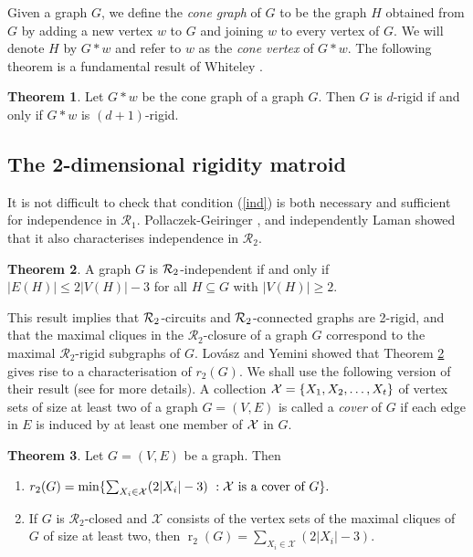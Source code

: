 \documentclass[11pt,a4paper]{article}
\theoremstyle{definition}
\newtheorem{theorem}{Theorem}[section]
\DeclareMathOperator{\rr}{r}
\newcommand{\cR}{\mathcal{R}}
\newcommand{\cX}{\mathcal{X}}
\begin{document}
Given a graph $G$, we define the {\em cone graph} of $G$ to be the graph $H$ obtained from $G$ by adding 
a new vertex $w$ to $G$ and joining $w$ to every vertex of $G$. 
We will denote $H$ by $G*w$ and refer to $w$ as the {\em cone vertex} of $G*w$. 
The following theorem is a fundamental result of Whiteley \cite{Whcone,Wlong}. %

\begin{theorem} 
\label{thm:coning} 
Let $G*w$ be the cone graph of a graph $G$. Then  
$G$ is  $d$-rigid if and only if $G*w$ is $(d+1)$-rigid.
\end{theorem}












\subsection{The 2-dimensional rigidity matroid}

It is not difficult to check that condition (\ref{ind}) is both necessary and sufficient for independence in $\cR_1$. Pollaczek-Geiringer \cite{PG},
and independently Laman \cite{laman}
showed that it also characterises independence in $\cR_2$.

\begin{theorem} \cite{laman,PG} 
\label{hilda} A graph $G$ is ${\cal R}_2$-independent if and only if 
$|E(H)|\leq 2|V(H)|-3$ for all $H\subseteq G$ with $|V(H)|\geq 2$.
\end{theorem}


This result implies that ${\cal R}_2$-circuits and ${\cal R}_2$-connected graphs are 2-rigid, and that the maximal cliques in the
$\cR_2$-closure of a graph $G$
correspond to the maximal $\cR_2$-rigid subgraphs of $G$.
Lov\'asz and Yemini \cite{LY} showed that Theorem \ref{hilda} gives rise to a characterisation of $r_2(G)$. 
We shall use the following version of their result (see \cite{Jmemoirs} for more details).
A collection ${\cal X}=\{X_1,X_2,\dots,X_t\}$ of vertex sets of size at least two of a graph $G=(V,E)$
is called a {\it cover} of $G$ if each edge in $E$ is induced by at least one
member of $\cal X$ in $G$.



\begin{theorem} \cite{LY}
\label{thm:lamanrank} 
Let $G=(V,E)$ be a graph. Then 
\begin{enumerate}
\item[(a)] $r_2(G) = \min \{ \sum_{X_i\in {\cal X}} (2|X_i|- 3)\ : {\cal X} \ \hbox{is a cover of}\  G\}.$
\item[(b)] If $G$ is  $\mathcal{R}_2$-closed  and $\cX$ consists of the vertex sets of the maximal cliques of $G$ of size at least two, then $\rr_2(G)=\sum_{X_i\in {\mathcal X}} (2|X_i|-3).$
\end{enumerate}
\end{theorem}
\end{document}
